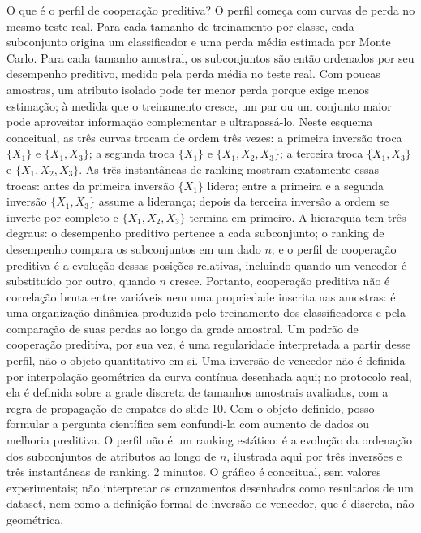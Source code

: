 \begin{frame}{O que é o perfil de cooperação preditiva?}
  \speakernotes
    {O perfil começa com curvas de perda no mesmo teste real. Para cada tamanho de treinamento por classe, cada subconjunto origina um classificador e uma perda média estimada por Monte Carlo. Para cada tamanho amostral, os subconjuntos são então ordenados por seu desempenho preditivo, medido pela perda média no teste real. Com poucas amostras, um atributo isolado pode ter menor perda porque exige menos estimação; à medida que o treinamento cresce, um par ou um conjunto maior pode aproveitar informação complementar e ultrapassá-lo. Neste esquema conceitual, as três curvas trocam de ordem três vezes: a primeira inversão troca $\{X_1\}$ e $\{X_1,X_3\}$; a segunda troca $\{X_1\}$ e $\{X_1,X_2,X_3\}$; a terceira troca $\{X_1,X_3\}$ e $\{X_1,X_2,X_3\}$. As três instantâneas de ranking mostram exatamente essas trocas: antes da primeira inversão $\{X_1\}$ lidera; entre a primeira e a segunda inversão $\{X_1,X_3\}$ assume a liderança; depois da terceira inversão a ordem se inverte por completo e $\{X_1,X_2,X_3\}$ termina em primeiro. A hierarquia tem três degraus: o desempenho preditivo pertence a cada subconjunto; o ranking de desempenho compara os subconjuntos em um dado $n$; e o perfil de cooperação preditiva é a evolução dessas posições relativas, incluindo quando um vencedor é substituído por outro, quando $n$ cresce. Portanto, cooperação preditiva não é correlação bruta entre variáveis nem uma propriedade inscrita nas amostras: é uma organização dinâmica produzida pelo treinamento dos classificadores e pela comparação de suas perdas ao longo da grade amostral. Um padrão de cooperação preditiva, por sua vez, é uma regularidade interpretada a partir desse perfil, não o objeto quantitativo em si. Uma inversão de vencedor não é definida por interpolação geométrica da curva contínua desenhada aqui; no protocolo real, ela é definida sobre a grade discreta de tamanhos amostrais avaliados, com a regra de propagação de empates do slide 10.}
    {Com o objeto definido, posso formular a pergunta científica sem confundi-la com aumento de dados ou melhoria preditiva.}
    {O perfil não é um ranking estático: é a evolução da ordenação dos subconjuntos de atributos ao longo de $n$, ilustrada aqui por três inversões e três instantâneas de ranking.}
    {2 minutos.}
    {O gráfico é conceitual, sem valores experimentais; não interpretar os cruzamentos desenhados como resultados de um dataset, nem como a definição formal de inversão de vencedor, que é discreta, não geométrica.}
\end{frame}

